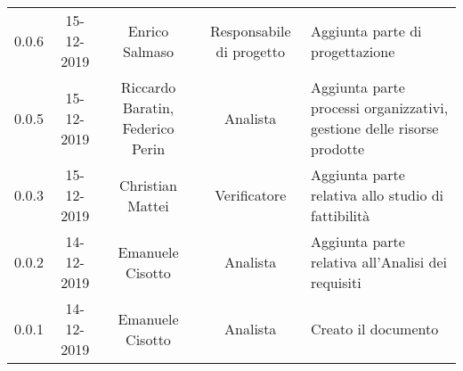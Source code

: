 {\begin{longtable}{ c c  c  c C{4cm}}
0.0.6 & 15-12-2019 & Enrico Salmaso & Responsabile di progetto & Aggiunta parte di progettazione \\

0.0.5 & 15-12-2019 & Riccardo Baratin, Federico Perin & Analista & Aggiunta parte processi organizzativi, gestione delle risorse prodotte \\

0.0.3 & 15-12-2019 & Christian Mattei & Verificatore & Aggiunta parte relativa allo studio di fattibilità \\

0.0.2 & 14-12-2019 & Emanuele Cisotto & Analista & Aggiunta parte relativa all’Analisi dei requisiti \\

0.0.1 & 14-12-2019 & Emanuele Cisotto & Analista & Creato il documento \\
		
\end{longtable}
}